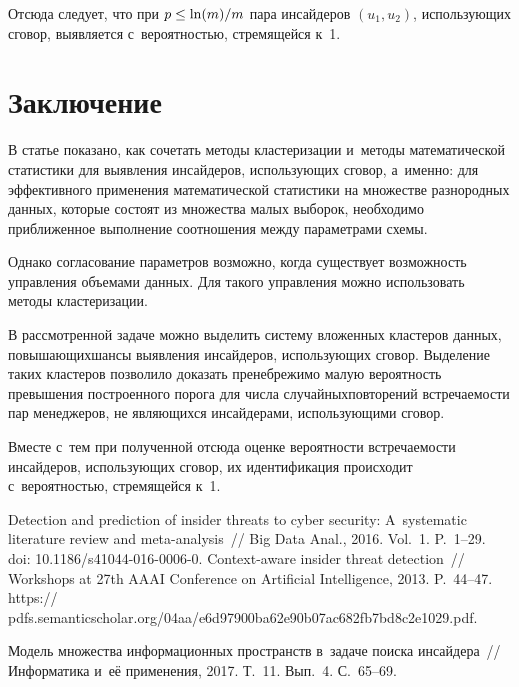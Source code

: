 \begin{multicols}{2}
  Отсюда следует, что при  $p\hm\leq \ln (m)/m$ пара инсайдеров $(u_1, u_2)$, 
использующих сговор, выявляется с~вероятностью, стремящейся к~1. 
  
  \section{Заключение }
  
  В статье показано, как сочетать методы клас\-те\-ри\-за\-ции и~методы 
математической статистики для выявления инсайдеров, использующих сговор, 
а~именно: для эффективного применения математической статистики на 
множестве разнородных данных, которые состоят из множества малых выборок, 
необходимо приближенное выполнение соотношения между параметрами схемы. 
  
  Однако согласование параметров возможно, когда существует возможность 
управления объемами данных. Для такого управления можно использовать методы 
кластеризации.
  
  В рассмотренной задаче можно выделить сис\-те\-му вложенных кластеров 
данных, повышающих\linebreak шансы выявления инсайдеров, использующих сговор. 
Выделение таких кластеров позволило доказать пренебрежимо малую 
вероятность превышения построенного порога для числа случайных\linebreak повторений 
встречаемости пар менеджеров, не являющихся инсайдерами, использующими 
сговор. 
  
  Вместе с~тем при полученной отсюда оценке вероятности встречаемости 
инсайдеров, использующих сговор, их идентификация происходит 
с~вероятностью, стремящейся к~1. 
  
{\small\frenchspacing
 {%
 \begin{thebibliography}{9}
 Detection and prediction of insider threats to cyber security: 
A~systematic literature review and meta-analysis~// Big Data Anal., 2016. 
Vol.~1. P.~1--29. doi:  10.1186/s41044-016-0006-0.
Context-aware insider threat detection~// 
Workshops at 27th AAAI Conference on Artificial Intelligence, 2013. 
P.~44--47. {\sf 
https:// pdfs.semanticscholar.org/04aa/e6d97900ba62e90b07ac6\linebreak 82fb7bd8c2e1029.pdf}.


 Модель множества 
информационных пространств в~задаче поиска инсайдера~// Информатика и~её применения, 
2017. Т.~11. Вып.~4. С.~65--69.


\end{thebibliography}}}
\end{multicols}
